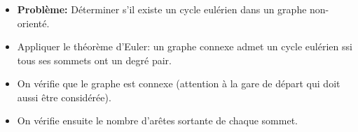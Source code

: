 \begin{frame}
    \frametitle{\problemtitle}
    \begin{itemize}
        \item<+-> \textbf{Problème:} Déterminer s'il existe un cycle eulérien dans un graphe non-orienté.
        \item<+-> Appliquer le théorème d'Euler: un graphe connexe admet un cycle eulérien ssi tous ses sommets ont un degré pair.
        \item<+-> On vérifie que le graphe est connexe (attention à la gare de départ qui doit aussi être considérée).
        \item<+-> On vérifie ensuite le nombre d'arêtes sortante de chaque sommet.

    \end{itemize}
\end{frame}
